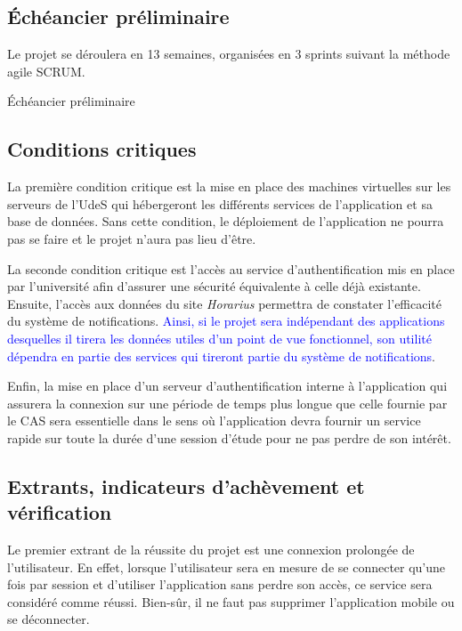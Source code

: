 	\subsection{Échéancier préliminaire}
	Le projet se déroulera en 13 semaines, organisées en 3 sprints suivant la méthode agile SCRUM.
	\begin{table}[hp]
		\centering
		\caption{Échéancier préliminaire}
		
		\label{tab.echeancier}
	\end{table}

	\subsection{Conditions critiques}
	La première condition critique est la mise en place des machines virtuelles sur les serveurs de l'UdeS qui hébergeront les différents services de l'application et sa base de données. Sans cette condition, le déploiement de l'application ne pourra pas se faire et le projet n'aura pas lieu d'être.

	La seconde condition critique est l'accès au service d'authentification mis en place par l'université afin d'assurer une sécurité équivalente à celle déjà existante. Ensuite, l'accès aux données du site \emph{Horarius} permettra de constater l'efficacité du système de notifications. \textcolor{blue}{Ainsi, si le projet sera indépendant des applications desquelles il tirera les données utiles d'un point de vue fonctionnel, son utilité dépendra en partie des services qui tireront partie du système de notifications}.

	Enfin, la mise en place d'un serveur d'authentification interne à l'application qui assurera la connexion sur une période de temps plus longue que celle fournie par le CAS sera essentielle dans le sens où l'application devra fournir un service rapide sur toute la durée d'une session d’étude pour ne pas perdre de son intérêt.

	\subsection{Extrants, indicateurs d'achèvement et vérification}
	Le premier extrant de la réussite du projet est une connexion prolongée de l’utilisateur. En effet, lorsque l’utilisateur sera en mesure de se connecter qu’une fois par session et d’utiliser l’application sans perdre son accès, ce service sera considéré comme réussi. Bien-sûr, il ne faut pas supprimer l’application mobile ou se déconnecter.

